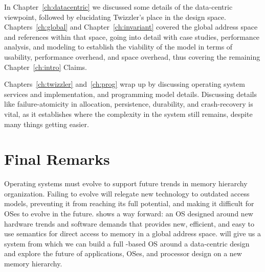 In Chapter~\ref{ch:datacentric} we discussed some details of the data-centric viewpoint, followed by elucidating
Twizzler's place in the design space. Chapters~\ref{ch:global} and Chapter~\ref{ch:invariant} covered the global address
space and references within that space, going into detail with case studies, performance analysis, and modeling to
establish the viability of the model in terms of usability, performance overhead, and space overhead, thus covering the
remaining Chapter~\ref{ch:intro} Claims.

Chapters~\ref{ch:twizzler} and~\ref{ch:prog} wrap up by discussing operating system services and implementation, and
programming model details. Discussing details like failure-atomicity in allocation, persistence, durability, and
crash-recovery is vital, as it establishes where the complexity in the system still remains, despite many things getting
easier.


\section{Final Remarks}



Operating systems must evolve to support future trends in memory hierarchy
organization. Failing to evolve will relegate new technology to
outdated access models, preventing it from reaching its full potential,
and making it difficult for OSes to evolve in the
future. \Twizzler shows a way forward: an
OS designed around new hardware trends and software demands that provides
new, efficient, and easy to use semantics for direct access to memory in a global address space.
\Twizzler will give us a system from which
we can build a full \NVM-based OS around a data-centric design and explore the future of applications, OSes, and
processor design on a new memory hierarchy.


